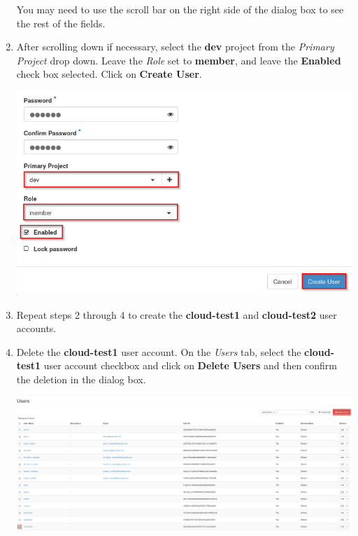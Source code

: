 \documentclass[letterpaper, 12pt]{article}
\begin{document}
\begin{enumerate}
    \begin{tipbox}
        You may need to use the scroll bar on the right side of the dialog box to see the rest of the fields.
    \end{tipbox}

    \item After scrolling down if necessary, select the \textbf{dev} project from the \textit{Primary Project} drop
    down. Leave the \textit{Role} set to \textbf{member}, and leave the \textbf{Enabled} check box selected. Click on
    \textbf{Create User}.

    \begin{center}
        \includegraphics[width=\linewidth]{images/part3/step4.png}
    \end{center}

    \item Repeat steps 2 through 4 to create the \textbf{cloud-test1} and \textbf{cloud-test2} user accounts.

    \item Delete the \textbf{cloud-test1} user account. On the \textit{Users} tab, select the \textbf{cloud-test1} user
    account checkbox and click on \textbf{Delete Users} and then confirm the deletion in the dialog box.

    \begin{center}
        \includegraphics[width=\linewidth]{images/part3/step6.png}
    \end{center}


\end{enumerate}
\end{document}
